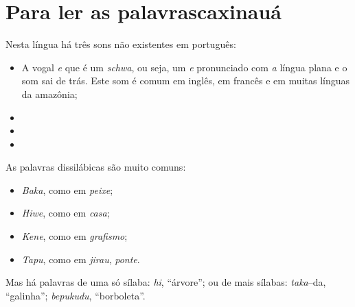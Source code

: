 \chapter[Para ler as palavras caxinauá]{Para ler as palavras\break caxinauá}


\bigskip

\noindent{}Nesta língua há três sons não existentes em português:

\begin{itemize}
\item A vogal \textit{e} que é um \textit{schwa}, ou seja, um \textit{e} pronunciado com \textit{a} língua plana e o som sai de trás. Este som é comum em inglês, em francês e em muitas línguas da amazônia;

\item {}

\item {}

\item {}
\end{itemize}

\noindent{}As palavras dissilábicas são muito comuns:

\begin{itemize}
\item \textit{Baka}, como em \textit{peixe};
\item \textit{Hiwe}, como em \textit{casa};
\item \textit{Kene}, como em \textit{grafismo};
\item \textit{Tapu}, como em \textit{jirau}, \textit{ponte}.
\end{itemize}

\noindent{}Mas há palavras de uma só sílaba: \textit{hi}, ``árvore''; ou de mais sílabas: \textit{taka}--da, ``galinha''; \textit{bepukudu}, ``borboleta''.


